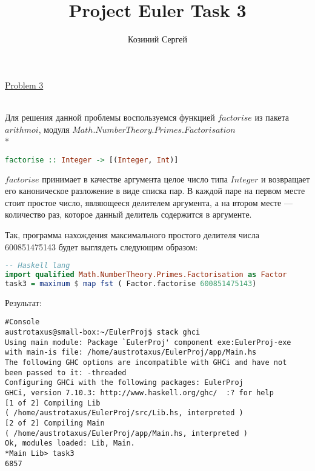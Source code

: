 \documentclass[11pt,a4paper]{article}
\title{Project Euler Task 3}
\author{Козиний Сергей}
\begin{document}
    
\maketitle
\href{''https://projecteuler.net/problem=3''}{Problem 3}

\\



Для решения данной  проблемы воспользуемся функцией $factorise$ из пакета $arithmoi$, модуля $Math.NumberTheory.Primes.Factorisation $   \\*
\begin{lstlisting}[language=Haskell, frame=single]
factorise :: Integer -> [(Integer, Int)]
\end{lstlisting}

$factorise$ принимает в качестве аргумента целое число типа $Integer$ и возвращает его каноническое разложение в виде списка пар. В каждой паре на первом месте стоит простое число, являющееся делителем аргумента, а на втором месте --- количество раз, которое данный делитель содержится в аргументе. 

Так, программа нахождения максимального простого делителя числа 600851475143 будет выглядеть следующим образом:
\begin{lstlisting}[language=Haskell, frame=single]
-- Haskell lang
import qualified Math.NumberTheory.Primes.Factorisation as Factor
task3 = maximum $ map fst ( Factor.factorise 600851475143)

\end{lstlisting}

Результат:
\begin{lstlisting}[frame=single]
#Console
austrotaxus@small-box:~/EulerProj$ stack ghci
Using main module: Package `EulerProj' component exe:EulerProj-exe
with main-is file: /home/austrotaxus/EulerProj/app/Main.hs
The following GHC options are incompatible with GHCi and have not
been passed to it: -threaded
Configuring GHCi with the following packages: EulerProj
GHCi, version 7.10.3: http://www.haskell.org/ghc/  :? for help
[1 of 2] Compiling Lib
( /home/austrotaxus/EulerProj/src/Lib.hs, interpreted )
[2 of 2] Compiling Main
( /home/austrotaxus/EulerProj/app/Main.hs, interpreted )
Ok, modules loaded: Lib, Main. 
*Main Lib> task3
6857
\end{lstlisting}
\end{document}
